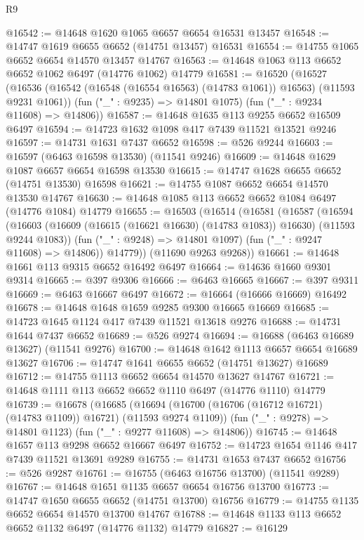 \begin{lexlean}{R9}
\begin{coremodule}
@16542 := @14648 @1620 @1065 @6657 @6654 @16531 @13457
@16548 := @14747 @1619 @6655 @6652 (@14751 @13457) @16531
@16554 := @14755 @1065 @6652 @6654 @14570 @13457 @14767
@16563 := @14648 @1063 @113 @6652 @6652 @1062 @6497 (@14776 @1062) @14779
@16581 := @16520
    (@16527
      (@16536 (@16542 (@16548 (@16554 @16563) (@14783 @1061)) @16563) (@11593 @9231 @1061))
      (fun ("_" : @9235) => @14801 @1075)
      (fun ("_" : @9234 @11608) => @14806))
@16587 := @14648 @1635 @113 @9255 @6652 @16509 @6497
@16594 := @14723 @1632 @1098 @417 @7439 @11521 @13521 @9246
@16597 := @14731 @1631 @7437 @6652
@16598 := @526 @9244
@16603 := @16597 (@6463 @16598 @13530) (@11541 @9246)
@16609 := @14648 @1629 @1087 @6657 @6654 @16598 @13530
@16615 := @14747 @1628 @6655 @6652 (@14751 @13530) @16598
@16621 := @14755 @1087 @6652 @6654 @14570 @13530 @14767
@16630 := @14648 @1085 @113 @6652 @6652 @1084 @6497 (@14776 @1084) @14779
@16655 := @16503
    (@16514
      (@16581
        (@16587
          (@16594
            (@16603 (@16609 (@16615 (@16621 @16630) (@14783 @1083)) @16630) (@11593 @9244 @1083))
            (fun ("_" : @9248) => @14801 @1097)
            (fun ("_" : @9247 @11608) => @14806))
          @14779))
      (@11690 @9263 @9268))
@16661 := @14648 @1661 @113 @9315 @6652 @16492 @6497
@16664 := @14636 @1660 @9301 @9314
@16665 := @397 @9306
@16666 := @6463 @16665
@16667 := @397 @9311
@16669 := @6463 @16667 @6497
@16672 := @16664 (@16666 @16669) @16492
@16678 := @14648 @1648 @1659 @9285 @9300 @16665 @16669
@16685 := @14723 @1645 @1124 @417 @7439 @11521 @13618 @9276
@16688 := @14731 @1644 @7437 @6652
@16689 := @526 @9274
@16694 := @16688 (@6463 @16689 @13627) (@11541 @9276)
@16700 := @14648 @1642 @1113 @6657 @6654 @16689 @13627
@16706 := @14747 @1641 @6655 @6652 (@14751 @13627) @16689
@16712 := @14755 @1113 @6652 @6654 @14570 @13627 @14767
@16721 := @14648 @1111 @113 @6652 @6652 @1110 @6497 (@14776 @1110) @14779
@16739 := @16678
    (@16685
      (@16694 (@16700 (@16706 (@16712 @16721) (@14783 @1109)) @16721) (@11593 @9274 @1109))
      (fun ("_" : @9278) => @14801 @1123)
      (fun ("_" : @9277 @11608) => @14806))
@16745 := @14648 @1657 @113 @9298 @6652 @16667 @6497
@16752 := @14723 @1654 @1146 @417 @7439 @11521 @13691 @9289
@16755 := @14731 @1653 @7437 @6652
@16756 := @526 @9287
@16761 := @16755 (@6463 @16756 @13700) (@11541 @9289)
@16767 := @14648 @1651 @1135 @6657 @6654 @16756 @13700
@16773 := @14747 @1650 @6655 @6652 (@14751 @13700) @16756
@16779 := @14755 @1135 @6652 @6654 @14570 @13700 @14767
@16788 := @14648 @1133 @113 @6652 @6652 @1132 @6497 (@14776 @1132) @14779
@16827 := @16129

\end{coremodule}
\end{lexlean}
